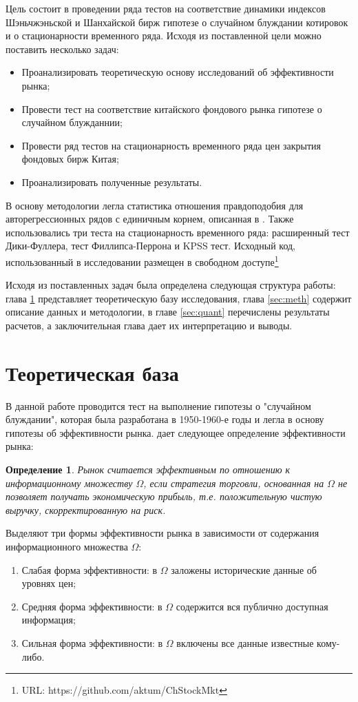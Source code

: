 \documentclass[a4paper,12pt]{article}
\newtheorem{definition}{Определение}
\begin{document}
Цель состоит в проведении ряда тестов на соответствие динамики индексов Шэньчжэньской и Шанхайской бирж гипотезе о случайном блуждании котировок и о стационарности временного ряда. Исходя из поставленной цели можно поставить несколько задач:
\begin{itemize}
  \item Проанализировать теоретическую основу исследований об эффективности рынка;
  \item Провести тест на соответствие китайского фондового рынка гипотезе о случайном блужданнии;
  \item Провести ряд тестов на стационарность временного ряда цен закрытия фондовых бирж Китая;
  \item Проанализировать полученные результаты.
\end{itemize}

В основу методологии легла статистика отношения правдоподобия для авторегрессионных рядов с единичным корнем, описанная в \cite{Dickey1981}. Также использовались три теста на стационарность временного ряда: расширенный тест Дики-Фуллера, тест Филлипса-Перрона и KPSS тест. Исходный код, использованный в исследовании размещен в свободном доступе{\footnote{URL: https://github.com/aktum/ChStockMkt}}

Исходя из поставленных задач была определена следующая структура работы: глава \ref{sec:litrev} представляет теоретическую базу исследования, глава \ref{sec:meth} содержит описание данных и методологии, в главе \ref{sec:quant} перечислены результаты расчетов, а заключительная глава дает их интерпретацию и выводы.
\newpage
\section{Теоретическая база}\label{sec:litrev}

В данной работе проводится тест на выполнение гипотезы о "случайном блуждании", которая была разработана в 1950-1960-е годы и легла в основу гипотезы об эффективности рынка. \cite{Jensen1978} дает следующее определение эффективности рынка:

\begin{definition}
  Рынок считается эффективным по отношению к информационному множеству $\Omega$, если стратегия торговли, основанная на $\Omega$ не позволяет получать экономическую прибыль, т.е. положительную чистую выручку, скорректированную на риск.
\end{definition}

Выделяют три формы эффективности рынка в зависимости от содержания информационного множества $\Omega$:
\begin{enumerate}
  \item Слабая форма эффективности: в $\Omega$ заложены исторические данные об уровнях цен;
  \item Средняя форма эффективности: в $\Omega$ содержится вся публично доступная информация;
  \item Сильная форма эффективности: в $\Omega$ включены все данные известные кому-либо.
\end{enumerate}
\end{document}
